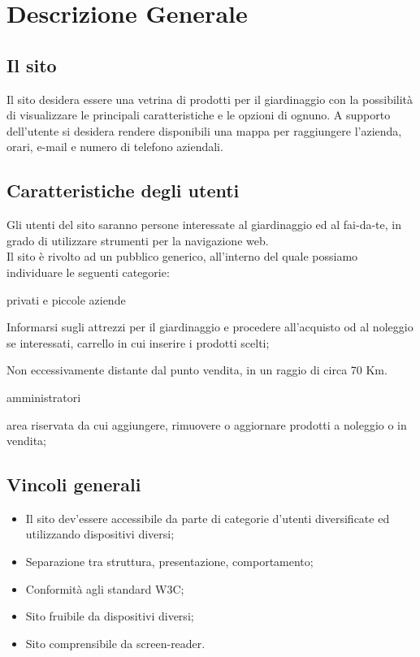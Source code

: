 \section{Descrizione Generale}{
	\subsection{Il sito}{
		Il sito desidera essere una vetrina di prodotti per il giardinaggio con la possibilità di visualizzare le principali caratteristiche e le opzioni di ognuno.
		A supporto dell'utente si desidera rendere disponibili una mappa per raggiungere l'azienda, orari, e-mail e numero di telefono aziendali.
	}
	\subsection{Caratteristiche degli utenti}{
		Gli utenti del sito saranno persone interessate al giardinaggio ed al fai-da-te, in grado di utilizzare strumenti per la navigazione web. \\
		Il sito è rivolto ad un pubblico generico, all'interno del quale possiamo individuare le seguenti categorie:
		\begin{description}\itemsep1pt
			\item[Categoria di utenti:] privati e piccole aziende
			\begin{description}\itemsep1pt
				\item[Funzionalità:] Informarsi sugli attrezzi per il giardinaggio e procedere all'acquisto od al noleggio se interessati, carrello in cui inserire i prodotti scelti; 
				\item[Termini generali:] Non eccessivamente distante dal punto vendita, in un raggio di circa 70 Km.
			\end{description}
			\item[Categoria di utenti:] amministratori
			\begin{description}\itemsep1pt
				\item[Funzionalità:] area riservata da cui aggiungere, rimuovere o aggiornare prodotti a noleggio o in vendita;
			\end{description}
		\end{description}
	}
	\subsection{Vincoli generali}{
		\begin{itemize}\itemsep1pt
			\item Il sito dev'essere accessibile da parte di categorie d'utenti diversificate ed utilizzando dispositivi diversi;
			\item Separazione tra struttura, presentazione, comportamento;
			\item Conformità agli standard W3C;
			\item Sito fruibile da dispositivi diversi;
			\item Sito comprensibile da screen-reader.
		\end{itemize}
	}
}
